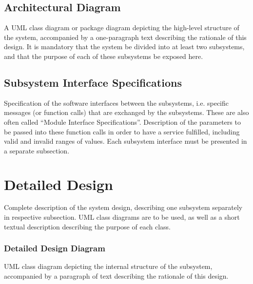 \documentclass[12pt]{article}
\begin{document}
\subsection{Architectural Diagram}

A UML class diagram or package diagram depicting the high-level structure of the system,
accompanied by a one-paragraph text describing the rationale of this design.
It is mandatory that the system be divided into at least two subsystems,
and that the purpose of each of these subsystems be exposed here.

\subsection{Subsystem Interface Specifications}

Specification of the software interfaces between the subsystems,
i.e. specific messages (or function calls) that are exchanged by the subsystems.
These are also often called ``Module Interface Specifications''.
Description of the parameters to be passed into these function calls in order to have a service fulfilled,
including valid and invalid ranges of values.
Each subsystem interface must be presented in a separate subsection.

\section{Detailed Design} \label{sec:detail}

Complete description of the system design, describing one subsystem separately in respective subsection.
UML class diagrams are to be used, as well as a short textual description describing the purpose of each class.





\subsubsection{Detailed Design Diagram}

UML class diagram depicting the internal structure of the subsystem,
accompanied by a paragraph of text describing the rationale of this design.
\end{document}
